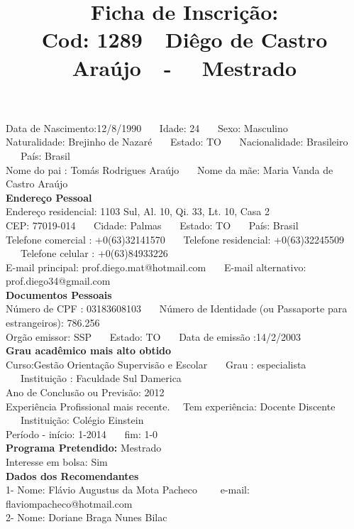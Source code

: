 \documentclass[11pt]{article}
\title{\vspace*{-4cm} Ficha de Inscrição: \\Cod: 1289\ \ Diêgo de Castro Araújo\ \ - \ \ Mestrado 
 }
\date{}
\begin{document}
\maketitle
\vspace*{-1.5cm}
\noindent Data de Nascimento:12/8/1990
\ \ \ Idade: 24   \ \ \ Sexo: Masculino
\\
Naturalidade: Brejinho de Nazaré  
\ \ \  Estado: TO
\ \ \  Nacionalidade: Brasileiro
\ \ \ País: Brasil
\\        
Nome do pai : Tomás Rodrigues Araújo
\ \ \ Nome da mãe: Maria Vanda de Castro Araújo          
\\[0.2cm]                     
\textbf{Endereço Pessoal} 
\\ 
\noindent Endereço residencial: 1103 Sul, Al. 10, Qi. 33, Lt. 10, Casa 2
\\
        CEP: 77019-014 
\ \ \ Cidade: Palmas 
\ \ \ Estado: TO 
\ \ \ País: Brasil
\\		
		Telefone comercial : +0(63)32141570
\ \ \ Telefone residencial: +0(63)32245509
\ \ \ Telefone celular : +0(63)84933226
\\
E-mail principal: prof.diego.mat@hotmail.com
\ \ \ E-mail alternativo: prof.diego34@gmail.com 
\\[0.2cm] 
\textbf{Documentos Pessoais}
\\
\noindent Número de CPF : 03183608103
\ \ \ Número de Identidade (ou Passaporte para estrangeiros): 786.256
\\
Orgão emissor: SSP
\ \ \ Estado: TO
\ \ \ Data de emissão :14/2/2003
\\[0.3cm]
\textbf{Grau acadêmico mais alto obtido}
\\	
Curso:Gestão Orientação Supervisão e Escolar
\ \ \ Grau : especialista
\ \ \ Instituição : Faculdade Sul Damerica
\\			
Ano de Conclusão ou Previsão: 2012
\\ 
Experiência Profissional mais recente. \ \  
Tem experiência: Docente Discente  
\ \ \ Instituição: Colégio Einstein
\\  
Período - início: 1-2014
\ \ \ fim: 1-0
\\[0.2cm] 
\textbf{Programa Pretendido:} Mestrado\\
Interesse em bolsa: Sim
\\[0.3cm]		
\textbf{Dados dos Recomendantes} 
\\
1- Nome: Flávio Augustus da Mota Pacheco
\ \ \ \  e-mail: flaviompacheco@hotmail.com 
\\
2- Nome: Doriane Braga Nunes Bilac
\end{document}
